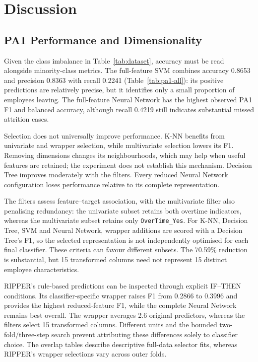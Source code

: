 \section{Discussion}
\subsection{PA1 Performance and Dimensionality}
Given the class imbalance in Table~\ref{tab:dataset}, accuracy must be read alongside minority-class metrics. The full-feature SVM combines accuracy 0.8653 and precision 0.8363 with recall 0.2241 (Table~\ref{tab:pa1-all}): its positive predictions are relatively precise, but it identifies only a small proportion of employees leaving. The full-feature Neural Network has the highest observed PA1 F1 and balanced accuracy, although recall 0.4219 still indicates substantial missed attrition cases.

Selection does not universally improve performance. K-NN benefits from univariate and wrapper selection, while multivariate selection lowers its F1. Removing dimensions changes its neighbourhoods, which may help when useful features are retained; the experiment does not establish this mechanism. Decision Tree improves moderately with the filters. Every reduced Neural Network configuration loses performance relative to its complete representation.

The filters assess feature--target association, with the multivariate filter also penalising redundancy: the univariate subset retains both overtime indicators, whereas the multivariate subset retains only \texttt{OverTime\_Yes}. For K-NN, Decision Tree, SVM and Neural Network, wrapper additions are scored with a Decision Tree's F1, so the selected representation is not independently optimised for each final classifier. These criteria can favour different subsets. The 70.59\% reduction is substantial, but 15 transformed columns need not represent 15 distinct employee characteristics.


RIPPER's rule-based predictions can be inspected through explicit IF--THEN
conditions. Its classifier-specific wrapper raises F1 from 0.2866 to 0.3996
and provides the highest reduced-feature F1, while the complete Neural
Network remains best overall. The wrapper averages 2.6 original predictors,
whereas the filters select 15 transformed columns. Different units and the
bounded two-fold/three-step search prevent attributing these differences
solely to classifier choice. The overlap tables describe descriptive full-data
selector fits, whereas RIPPER's wrapper selections vary across outer folds.

